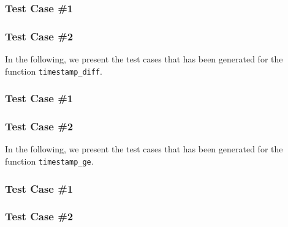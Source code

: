 \subsubsection{Test Case \#1}


\subsubsection{Test Case \#2}



In the following, we present the test cases that has been generated for the function \texttt{timestamp\_diff}.

\subsubsection{Test Case \#1}


\subsubsection{Test Case \#2}




In the following, we present the test cases that has been generated for the function \texttt{timestamp\_ge}.

\subsubsection{Test Case \#1}


\subsubsection{Test Case \#2}


